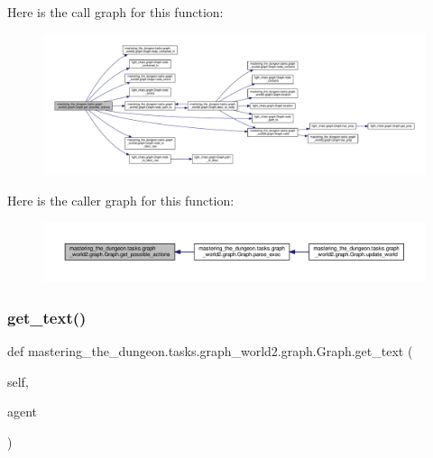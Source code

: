 Here is the call graph for this function\+:
\nopagebreak
\begin{figure}[H]
\begin{center}
\leavevmode
\includegraphics[width=350pt]{classmastering__the__dungeon_1_1tasks_1_1graph__world2_1_1graph_1_1Graph_adae1cb52439416a6a372d2b5fe4e7fb0_cgraph}
\end{center}
\end{figure}
Here is the caller graph for this function\+:
\nopagebreak
\begin{figure}[H]
\begin{center}
\leavevmode
\includegraphics[width=350pt]{classmastering__the__dungeon_1_1tasks_1_1graph__world2_1_1graph_1_1Graph_adae1cb52439416a6a372d2b5fe4e7fb0_icgraph}
\end{center}
\end{figure}
\mbox{\label{classmastering__the__dungeon_1_1tasks_1_1graph__world2_1_1graph_1_1Graph_a4b907114300b2b6fe26492336654dc3a}} 
\subsubsection{\texorpdfstring{get\+\_\+text()}{get\_text()}}
{\footnotesize\ttfamily def mastering\+\_\+the\+\_\+dungeon.\+tasks.\+graph\+\_\+world2.\+graph.\+Graph.\+get\+\_\+text (\begin{DoxyParamCaption}\item[{}]{self,  }\item[{}]{agent }\end{DoxyParamCaption})}



